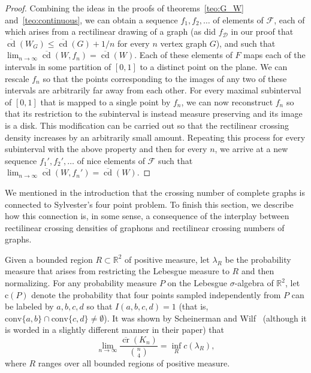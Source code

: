 \documentclass{article}
\begin{document}
\begin{proof}
    Combining the ideas in the proofs of theorems~\ref{teo:G_W} and~\ref{teo:continuous}, we can obtain a sequence $f_1,f_2,\dots$ of elements of $\mathcal{F}$, each of which arises from a rectilinear drawing of a graph (as did $f_\mathcal{D}$ in our proof that $\overline{\mathop{\mathrm{cd}}}(W_G)\leq\overline{\mathop{\mathrm{cd}}}(G)+1/n$ for every $n$ vertex graph $G$), and such that $\lim_{n\rightarrow\infty}\overline{\mathop{\mathrm{cd}}}(W,f_n)=\overline{\mathop{\mathrm{cd}}}(W)$. Each of these elements of $F$ maps each of the intervals in some partition of $[0,1]$ to a distinct point on the plane. We can rescale $f_n$ so that the points corresponding to the images of any two of these intervals are arbitrarily far away from each other. For every maximal subinterval of $[0,1]$ that is mapped to a single point by $f_n$, we can now reconstruct $f_n$ so that its restriction to the subinterval is instead measure preserving and its image is a disk. This modification can be carried out so that the rectilinear crossing density increases by an arbitrarily small amount. Repeating this process for every subinterval with the above property and then for every $n$, we arrive at a new sequence $f_1',f_2',\dots$ of nice elements of $\mathcal{F}$ such that $\lim_{n\rightarrow\infty}\overline{\mathop{\mathrm{cd}}}(W,f_n')=\overline{\mathop{\mathrm{cd}}}(W)$.
\end{proof}


We mentioned in the introduction that the crossing number of complete graphs is connected to Sylvester's four point problem. To finish this section, we describe how this connection is, in some sense, a consequence of the interplay between rectilinear crossing densities of graphons and rectilinear crossing numbers of graphs.

Given a bounded region $R\subset\mathbb{R}^2$ of positive measure, let $\lambda_R$ be the probability measure that arises from restricting the Lebesgue measure to $R$ and then normalizing. For any probability measure $P$ on the Lebesgue $\sigma$-algebra of $\mathbb{R}^2$, let $\text{c}(P)$ denote the probability that four points sampled independently from $P$ can be labeled by $a,b,c,d$ so that $I(a,b,c,d)=1$ (that is, $\text{conv}\{a,b\}\cap\text{conv}\{c,d\}\neq\emptyset$). It was shown by Scheinerman and Wilf~\cite{sylvester} (although it is worded in a slightly different manner in their paper) that \[\lim_{n\rightarrow\infty}\frac{\overline{\mathop{\mathrm{cr}}}(K_n)}{\binom{n}{4}}=\inf_{R}c(\lambda_R),\] where $R$ ranges over all bounded regions of positive measure. 
\end{document}
